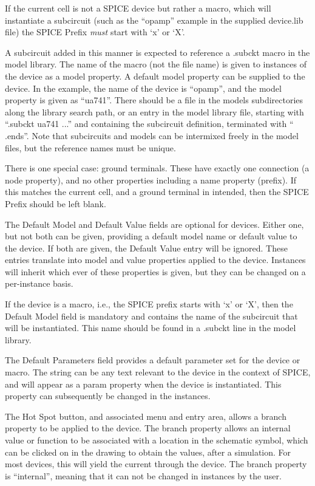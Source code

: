 If the current cell is not a SPICE device but rather a macro, which
will instantiate a subcircuit (such as the ``{\vt opamp}'' example in
the supplied {\vt device.lib} file) the SPICE Prefix {\it must} start
with `{\vt x}' or `{\vt X}'.

A subcircuit added in this manner is expected to reference a {\vt
.subckt} macro in the model library.  The name of the macro (not the
file name) is given to instances of the device as a {\et model}
property.  A default model property can be supplied to the device.  In
the example, the name of the device is ``{\vt opamp}'', and the {\et
model} property is given as ``{\vt ua741}''.  There should be a file
in the models subdirectories along the library search path, or an
entry in the model library file, starting with ``{\vt .subckt ua741}
...'' and containing the subcircuit definition, terminated with ``{\vt
.ends}''.  Note that subcircuits and models can be intermixed freely
in the model files, but the reference names must be unique.

There is one special case:  ground terminals.  These have exactly one
connection (a {\et node} property), and no other properties including
a {\et name} property (prefix).  If this matches the current cell, and
a ground terminal in intended, then the {\cb SPICE Prefix} should be
left blank.

The {\cb Default Model} and {\cb Default Value} fields are optional
for devices.  Either one, but not both can be given, providing a
default model name or default value to the device.  If both are given,
the {\cb Default Value} entry will be ignored.  These entries
translate into {\et model} and {\et value} properties applied to the
device.  Instances will inherit which ever of these properties is
given, but they can be changed on a per-instance basis.

If the device is a macro, i.e., the SPICE prefix starts with `{\vt x}'
or `{\vt X}', then the {\cb Default Model} field is mandatory and
contains the name of the subcircuit that will be instantiated.  This
name should be found in a {\vt .subckt} line in the model library.

The {\cb Default Parameters} field provides a default parameter set
for the device or macro.  The string can be any text relevant to the
device in the context of SPICE, and will appear as a {\et param}
property when the device is instantiated.  This property can
subsequently be changed in the instances.

The {\cb Hot Spot} button, and associated menu and entry area, allows
a {\et branch} property to be applied to the device.  The {\et branch}
property allows an internal value or function to be associated with a
location in the schematic symbol, which can be clicked on in the
drawing to obtain the values, after a simulation.  For most devices,
this will yield the current through the device.  The {\et branch}
property is ``internal'', meaning that it can not be changed in
instances by the user.

